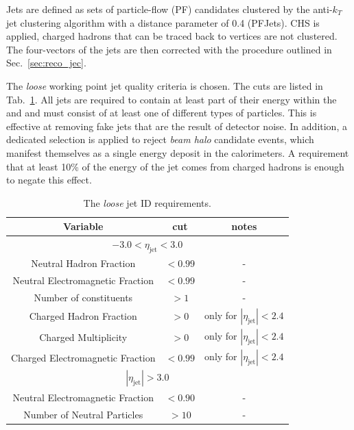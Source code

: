 Jets are defined as sets of particle-flow (PF) candidates clustered by
the anti-$k_{T}$ jet clustering algorithm with
a distance parameter of 0.4 (PFJets). \acf{CHS} is applied, charged
hadrons that can be traced back to \PU vertices are not clustered. The
four-vectors of the jets are then corrected with the procedure
outlined in Sec.~\ref{sec:reco_jec}.

The \emph{loose} working point jet quality criteria is chosen.  The cuts
are listed in Tab.~\ref{tab:loose-jet-id}. All jets are required to
contain at least part of their energy within the \ECAL and \HCAL and
must consist of at least one of different types of particles. This is
effective at removing fake jets that are the result of detector noise.
In addition, a dedicated selection is applied to reject \emph{beam
halo} candidate events, which manifest themselves as a single energy
deposit in the calorimeters. A requirement that at least 10\% of the
energy of the jet comes from charged hadrons is enough to negate this
effect.

\begin{table}[ht!]
  \caption{The \emph{loose} jet ID requirements. \label{tab:loose-jet-id}}
  \centering
  \begin{tabular}{ ccc }
    \hline
    \hline
    Variable & cut & notes \\ \hline
    \multicolumn{3}{c}{$-3.0 < \eta_{\mathrm{jet}} < 3.0$} \\ \hline    
    Neutral Hadron Fraction & $<0.99$ & - \\
    Neutral Electromagnetic Fraction & $<0.99$ & - \\
    Number of constituents & $>1$ & - \\
    Charged Hadron Fraction & $>0$ & only for $|\eta_{\mathrm{jet}}| < 2.4$ \\
    Charged Multiplicity & $>0$ & only for $|\eta_{\mathrm{jet}}| < 2.4$ \\
    Charged Electromagnetic Fraction & $<0.99$ & only for $|\eta_{\mathrm{jet}}| < 2.4$ \\ \hline
    \multicolumn{3}{c}{$|\eta_{\mathrm{jet}}| > 3.0$} \\ \hline        
    Neutral Electromagnetic Fraction & $<0.90$ & - \\
    Number of Neutral Particles & $>10$ & - \\
    \hline
    \hline
  \end{tabular}
\end{table}

